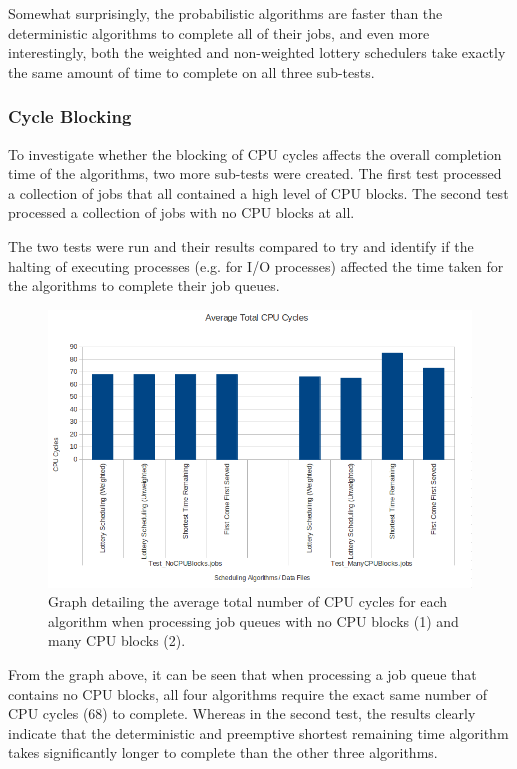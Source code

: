 \documentclass{acm_proc_article-sp}
\begin{document}
Somewhat surprisingly, the probabilistic algorithms are faster than the deterministic algorithms to complete all of their jobs, and even more interestingly, both the weighted and non-weighted lottery schedulers take exactly the same amount of time to complete on all three sub-tests. 

\subsubsection{Cycle Blocking}

To investigate whether the blocking of CPU cycles affects the overall completion time of the algorithms, two more sub-tests were created. The first test processed a collection of jobs that all contained a high level of CPU blocks. The second test processed a collection of jobs with no CPU blocks at all.

The two tests were run and their results compared to try and identify if the halting of executing processes (e.g. for I/O processes) affected the time taken for the algorithms to complete their job queues.

\begin{figure}[H]
\centering
\includegraphics[scale=0.3]{graph_cpucycles2.png}
\caption{Graph detailing the average total number of CPU cycles for each algorithm when processing job queues with no CPU blocks (1) and many CPU blocks (2).}
\end{figure} 

From the graph above, it can be seen that when processing a job queue that contains no CPU blocks, all four algorithms require the exact same number of CPU cycles (68) to complete. Whereas in the second test, the results clearly indicate that the deterministic and preemptive shortest remaining time algorithm takes significantly longer to complete than the other three algorithms. 
\end{document}
